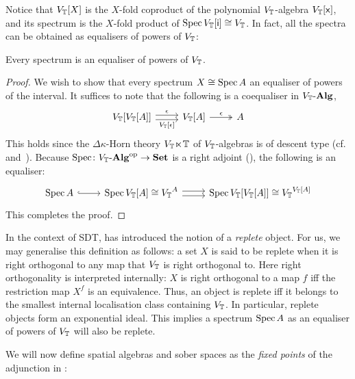Notice that ${V_{\mathbb{T}}}[X]$ is the $X$-fold coproduct of the polynomial ${V_{\mathbb{T}}}$-algebra ${V_{\mathbb{T}}}[\mathsf{x}]$, and its spectrum is the $X$-fold product of $\operatorname{Spec}{V_{\mathbb{T}}}[\mathsf{i}] \cong {V_{\mathbb{T}}}$. In fact, all the spectra can be obtained as equalisers of powers of ${V_{\mathbb{T}}}$:

\begin{proposition}\label{prop:spectra-are-powers-of-the-interval}
  Every spectrum is an equaliser of powers of ${V_{\mathbb{T}}}$. 
\end{proposition}
\begin{proof}
  We wish to show that every spectrum $X\cong\operatorname{Spec} A$ an equaliser of powers of the interval. It suffices to note that the following is a coequaliser in ${V_{\mathbb{T}}}\text{-}\mathbf{Alg}$,
  \[
  \begin{tikzcd}
    {V_\T}[{V_\T}[A]] \ar[r, shift left, "\epsilon"] \ar[r, shift right, "{{V_\T}[\epsilon]}"'] & {V_\T}[A] \ar[r, two heads, "\epsilon"] & A
  \end{tikzcd}
  \]
  This holds since the $\Delta\kappa$-Horn theory $V_{\mathbb{T}}\hspace{-.4ex}\ltimes\hspace{-.4ex}\mathbb{T}$ of $V_{\mathbb{T}}$-algebras is of descent type (cf.~ and~). Because $\operatorname{Spec}\colon {V_{\mathbb{T}}}\text{-}\mathbf{Alg}^{\mathrm{op}}\to\mathbf{Set}$ is a right adjoint (), the following is an equaliser:
  \[
  \begin{tikzcd}
    \spec A \ar[r, hook] & \spec{V_\T}[A] \cong {V_\T}^A \ar[r, shift left] \ar[r, shift right] & \spec{V_\T}[{V_\T}[A]]\cong{V_\T}^{{V_\T}[A]}
  \end{tikzcd}
  \]
  This completes the proof.
\end{proof}

\begin{remark}\label{rem:specarereplete}
  In the context of \gls{SDT}, \citet{hyland_first_2006} has introduced the notion of a \emph{replete} object. For us, we may generalise this definition as follows: a set $X$ is said to be replete when it is right orthogonal to any map that ${V_{\mathbb{T}}}$ is right orthogonal to. Here right orthogonality is interpreted internally: $X$ is right orthogonal to a map $f$ iff the restriction map $X^f$ is an equivalence. Thus, an object is replete iff it belongs to the smallest internal localisation class containing ${V_{\mathbb{T}}}$. In particular, replete objects form an exponential ideal. This implies a spectrum $\operatorname{Spec} A$ as an equaliser of powers of ${V_{\mathbb{T}}}$ will also be replete.
\end{remark}

We will now define spatial algebras and sober spaces as the \emph{fixed points} of the adjunction in :

